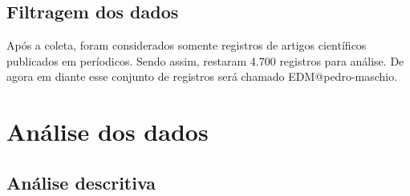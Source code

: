 \subsection{Filtragem dos dados}

Após a coleta, foram considerados somente registros de artigos científicos publicados em períodicos. Sendo assim, restaram 4.700 registros para análise. De agora em diante esse conjunto de registros será chamado EDM@pedro-maschio.

\section{Análise dos dados}

\subsection{Análise descritiva}

